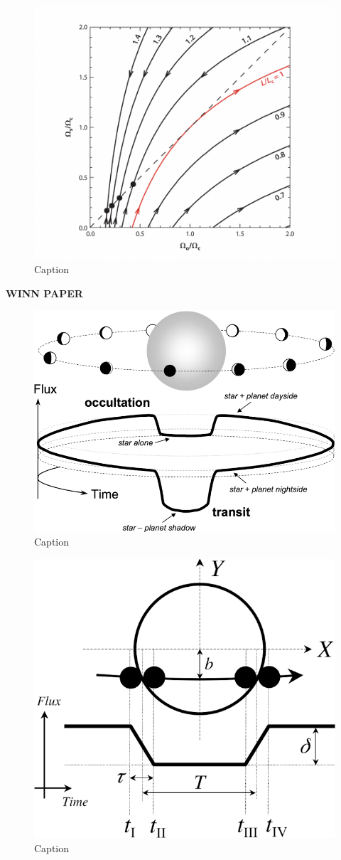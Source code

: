 \documentclass[oneside,12pt]{amsart}
\numberwithin{page}{section}
\begin{document}
\begin{figure}[htbp]
    \centering
    \includegraphics[width=0.5\linewidth]{figs/ogilvie_fig10.png}
    \caption{Caption}
    \label{fig:enter-label}
\end{figure}

\clearpage


\textbf{WINN PAPER}

\begin{figure}[htbp]
    \centering
    \includegraphics[width=0.5\linewidth]{figs/winn_fig1.png}
    \caption{Caption}
    \label{fig:enter-label}
\end{figure}

\begin{figure}[htbp]
    \centering
    \includegraphics[width=0.5\linewidth]{figs/winn_fig2.png}
    \caption{Caption}
    \label{fig:enter-label}
\end{figure}
\end{document}
